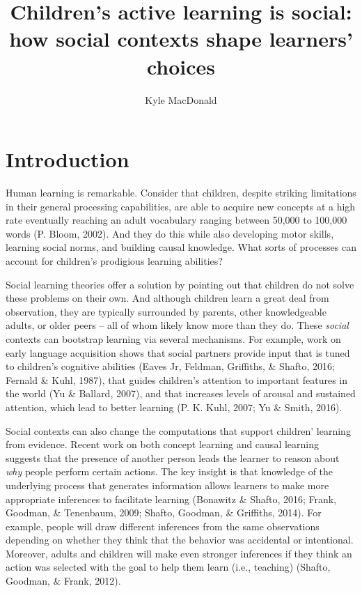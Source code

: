 \documentclass[a4paper,man,apacite,floatsintext]{apa6}
\date{}
\title{\textbf{Children's active learning is social: how social contexts shape
learners' choices}}
\author{Kyle MacDonald}
\affiliation{Department of Psychology, Stanford University}
\begin{document}
\maketitle

\section{Introduction}\label{introduction}

Human learning is remarkable. Consider that children, despite striking
limitations in their general processing capabilities, are able to
acquire new concepts at a high rate eventually reaching an adult
vocabulary ranging between 50,000 to 100,000 words (P. Bloom, 2002). And
they do this while also developing motor skills, learning social norms,
and building causal knowledge. What sorts of processes can account for
children's prodigious learning abilities?

Social learning theories offer a solution by pointing out that children
do not solve these problems on their own. And although children learn a
great deal from observation, they are typically surrounded by parents,
other knowledgeable adults, or older peers -- all of whom likely know
more than they do. These \emph{social} contexts can bootstrap learning
via several mechanisms. For example, work on early language acquisition
shows that social partners provide input that is tuned to children's
cognitive abilities (Eaves Jr, Feldman, Griffiths, \& Shafto, 2016;
Fernald \& Kuhl, 1987), that guides children's attention to important
features in the world (Yu \& Ballard, 2007), and that increases levels
of arousal and sustained attention, which lead to better learning (P. K.
Kuhl, 2007; Yu \& Smith, 2016).

Social contexts can also change the computations that support children'
learning from evidence. Recent work on both concept learning and causal
learning suggests that the presence of another person leads the learner
to reason about \emph{why} people perform certain actions. The key
insight is that knowledge of the underlying process that generates
information allows learners to make more appropriate inferences to
facilitate learning (Bonawitz \& Shafto, 2016; Frank, Goodman, \&
Tenenbaum, 2009; Shafto, Goodman, \& Griffiths, 2014). For example,
people will draw different inferences from the same observations
depending on whether they think that the behavior was accidental or
intentional. Moreover, adults and children will make even stronger
inferences if they think an action was selected with the goal to help
them learn (i.e., teaching) (Shafto, Goodman, \& Frank, 2012).
\end{document}
